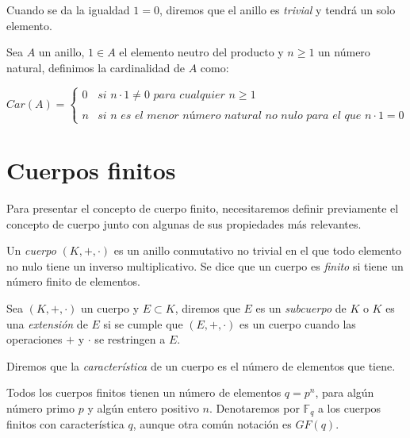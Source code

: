 Cuando se da la igualdad $1 = 0$, diremos que el anillo es \emph{trivial} y tendrá un solo elemento.

\begin{definition}
    Sea $A$ un anillo, $1 \in A$ el elemento neutro del producto y $n \geq 1$ un número natural, definimos la cardinalidad de $A$ como:

    \[
        Car(A) = \left\{ \begin{array}{lc}
        0 &   \textit{si } n \cdot 1 \neq 0 \textit{ para cualquier } n \geq 1 \\
        \\ n & \textit{si n es el menor número natural no nulo para el que } n \cdot 1 = 0
        \end{array}
        \right.
    \]
\end{definition}


\section{Cuerpos finitos}

Para presentar el concepto de cuerpo finito, necesitaremos definir previamente el concepto de cuerpo junto con algunas de sus propiedades más relevantes.

\begin{definition}
    Un \emph{cuerpo} $(K, +, \cdot)$ es un anillo conmutativo no trivial en el que todo elemento no nulo tiene un inverso multiplicativo. Se dice que un cuerpo es \emph{finito} si tiene un número finito de elementos.
\end{definition}

Sea $(K, +, \cdot)$ un cuerpo y $E \subset K$, diremos que $E$ es un \emph{subcuerpo} de $K$ o $K$ es una \emph{extensión} de $E$ si se cumple que $(E, +, \cdot)$ es un cuerpo cuando las operaciones $+$ y $\cdot$ se restringen a $E$.

Diremos que la \emph{característica} de un cuerpo es el número de elementos que tiene.

Todos los cuerpos finitos tienen un número de elementos $q = p^n$, para algún número primo $p$ y algún entero positivo $n$. Denotaremos por $\mathbb{F}_q$ a los cuerpos finitos con característica $q$, aunque otra común notación es $GF(q)$.


